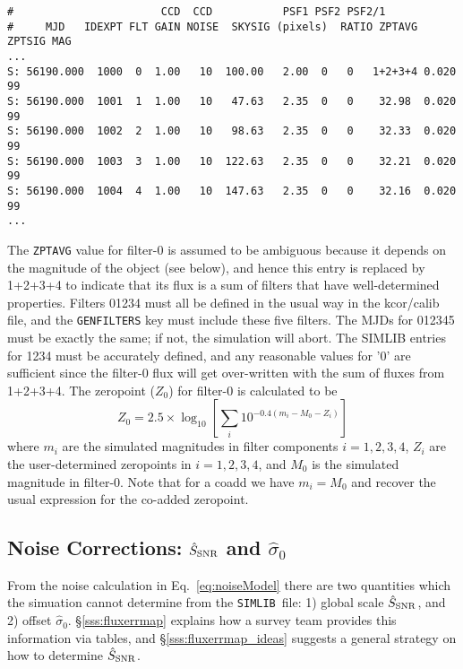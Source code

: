 \documentclass[12pt]{article}
\newcommand{\simlib}{{\tt SIMLIB}}
\newcommand{\sigOFF}{\hat\sigma_0}
\newcommand{\SSNR}{\hat{S}_{\rm SNR}}
\begin{document}
{\begin{Verbatim}[frame=single]
#                       CCD  CCD           PSF1 PSF2 PSF2/1                    
#     MJD   IDEXPT FLT GAIN NOISE  SKYSIG (pixels)  RATIO ZPTAVG ZPTSIG MAG 
...
S: 56190.000  1000  0  1.00   10  100.00   2.00  0   0   1+2+3+4 0.020  99
S: 56190.000  1001  1  1.00   10   47.63   2.35  0   0    32.98  0.020  99
S: 56190.000  1002  2  1.00   10   98.63   2.35  0   0    32.33  0.020  99
S: 56190.000  1003  3  1.00   10  122.63   2.35  0   0    32.21  0.020  99
S: 56190.000  1004  4  1.00   10  147.63   2.35  0   0    32.16  0.020  99
...
\end{Verbatim}
The {\tt ZPTAVG} value for filter-0 is assumed to be ambiguous 
because it depends on the magnitude of the object (see below), 
and hence this entry is replaced by 1+2+3+4 to indicate that 
its flux is a sum of filters that have well-determined properties.
Filters 01234 must all be defined in the usual way in the 
kcor/calib file, and the {\tt GENFILTERS} key must include
these five filters. The MJDs for 012345 must be exactly the
same; if not, the simulation will abort.
The SIMLIB entries for 1234 must be
accurately defined, and any reasonable values for '0' are sufficient
since the filter-0 flux will get over-written with the sum
of fluxes from 1+2+3+4. The zeropoint ($Z_0$) for filter-0 
is calculated to be
\begin{equation}
    Z_0 = 2.5 \times \log_{10}
  \left[
       \sum_i 10^{-0.4(m_i - M_0 - Z_i) }
  \right]
\end{equation}
%
where $m_i$ are the simulated magnitudes in 
filter components $i=1,2,3,4$,
$Z_i$ are the user-determined zeropoints in $i=1,2,3,4$,
and $M_0$ is the simulated magnitude in filter-0.
Note that for a coadd we have $m_i = M_0$  and recover
the usual expression for the co-added zeropoint.


   \clearpage
   \subsection{Noise Corrections: $\SSNR$ and $\sigOFF$ }
   \label{subsec:noise_cor}

From the noise calculation in Eq.~\ref{eq:noiseModel} there
are two quantities which the simuation cannot determine
from the \simlib\ file:  
1) global scale $\SSNR$, and 2) offset $\sigOFF$.
\S\ref{sss:fluxerrmap} explains how a survey team provides 
this information via tables, and
\S\ref{sss:fluxerrmap_ideas} suggests a general strategy on how
to determine $\SSNR$.

}
\end{document}
